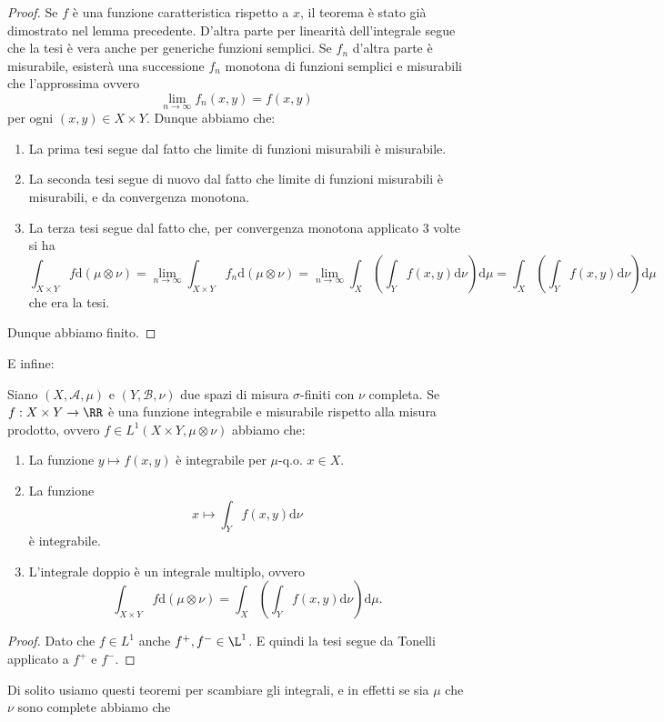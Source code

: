\documentclass[11pt]{scrartcl}
\newcommand{\dif}{\text{d}}
\begin{document}
	\begin{proof}
		Se $f$ è una funzione caratteristica rispetto a $x$, il teorema è stato già dimostrato nel lemma precedente. D'altra parte per linearità dell'integrale segue che la tesi è vera anche per generiche funzioni semplici. Se $f_n$ d'altra parte è misurabile, esisterà una successione $f_n$ monotona di funzioni semplici e misurabili che l'approssima ovvero
		$$\lim_{n\to\infty}f_n(x,y)=f(x,y)$$
		per ogni $(x,y)\in X\times Y$. Dunque abbiamo che:
		\begin{enumerate}
			\item La prima tesi segue dal fatto che limite di funzioni misurabili è misurabile.
			\item La seconda tesi segue di nuovo dal fatto che limite di funzioni misurabili è misurabili, e da convergenza monotona.
			\item La terza tesi segue dal fatto che, per convergenza monotona applicato $3$ volte si ha
			$$\int_{X\times Y}f\dif \left(\mu \otimes \nu\right)=\lim_{n\to\infty}\int_{X\times Y}f_n\dif \left(\mu \otimes \nu\right)=\lim_{n\to\infty}\int_X\left(\int_Y f(x,y)\dif \nu\right)\dif \mu=\int_X\left(\int_Y f(x,y)\dif \nu\right)\dif \mu$$
			che era la tesi.
		\end{enumerate}
		Dunque abbiamo finito.
	\end{proof}
	E infine:
	\begin{corollary}[Fubini]
		Siano $(X,\mathcal{A},\mu)$ e $(Y,\mathcal{B},\nu)$ due spazi di misura $\sigma$-finiti con $\nu$ completa. Se $f:X\times Y \to \RR$ è una funzione integrabile e misurabile rispetto alla misura prodotto, ovvero $f\in L^1\left(X\times Y, \mu \otimes \nu\right)$ abbiamo che:
		\begin{enumerate}
			\item La funzione $y\mapsto f(x,y)$ è integrabile per $\mu$-q.o. $x\in X$.
			\item La funzione
			$$x\mapsto \int_Y f(x,y)\dif \nu$$
			è integrabile.
			\item L'integrale doppio è un integrale multiplo, ovvero
			$$\int_{X\times Y} f\dif \left(\mu \otimes \nu\right)=\int_X\left(\int_Y f(x,y)\dif \nu\right)\dif \mu.$$
		\end{enumerate}
	\end{corollary}
	\begin{proof}
		Dato che $f\in L^1$ anche $f^+,f^-\in \L^1$. E quindi la tesi segue da Tonelli applicato a $f^+$ e $f^-$.
	\end{proof}
	Di solito usiamo questi teoremi per scambiare gli integrali, e in effetti se sia $\mu$ che $\nu$ sono complete abbiamo che
\end{document}
